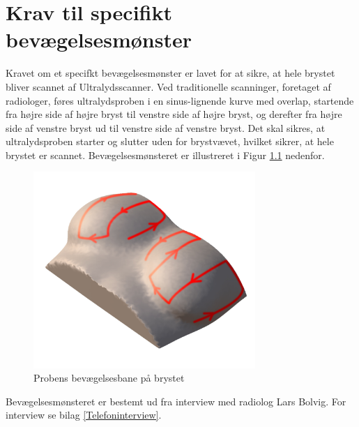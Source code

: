 \chapter{Krav til specifikt bevægelsesmønster} \label{Monster}
Kravet om et specifkt bevægelsesmønster er lavet for at sikre, at hele brystet bliver scannet af Ultralydsscanner. Ved traditionelle scanninger, foretaget af radiologer, føres ultralydsproben i en sinus-lignende kurve med overlap, startende fra højre side af højre bryst til venstre side af højre bryst, og derefter fra højre side af venstre bryst ud til venstre side af venstre bryst. Det skal sikres, at ultralydsproben starter og slutter uden for brystvævet, hvilket sikrer, at hele brystet er scannet. Bevægelsesmønsteret er illustreret i Figur \ref{Probensbevagelse} nedenfor. 

\begin{figure}[H]
    \centering
    \includegraphics[width=0.75\textwidth]{figurer/d/probebevagelse}
    \caption{Probens bevægelsesbane på brystet}
    \label{Probensbevagelse}
\end{figure}

Bevægelsesmønsteret er bestemt ud fra interview med radiolog Lars Bolvig. For interview se bilag \ref{Telefoninterview}. 